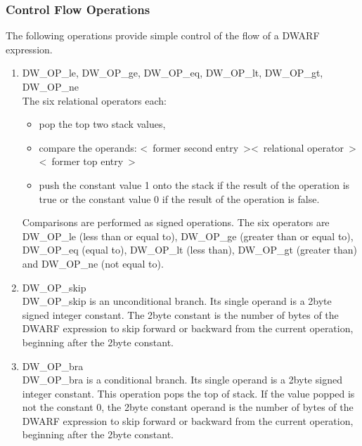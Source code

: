 \subsubsection{Control Flow Operations}
\label{chap:controlflowoperations}
The following operations provide simple control of the flow of a DWARF expression.
\begin{enumerate}[1]
\item  DW\-\_OP\-\_le, DW\-\_OP\-\_ge, DW\-\_OP\-\_eq, DW\-\_OP\-\_lt, DW\-\_OP\-\_gt, DW\-\_OP\-\_ne \\
The six relational operators each:
\begin{itemize}
\item pop the top two stack values,

\item compare the operands:
\textless~former second entry~\textgreater  \textless~relational operator~\textgreater \textless~former top entry~\textgreater

\item push the constant value 1 onto the stack 
if the result of the operation is true or the
constant value 0 if the result of the operation is false.
\end{itemize}

Comparisons are performed as signed operations. The six
operators are DW\-\_OP\-\_le (less than or equal to), DW\-\_OP\-\_ge
(greater than or equal to), DW\-\_OP\-\_eq (equal to), DW\-\_OP\-\_lt (less
than), DW\-\_OP\-\_gt (greater than) and DW\-\_OP\-\_ne (not equal to).

\item DW\-\_OP\-\_skip \\
DW\-\_OP\-\_skip is an unconditional branch. Its single operand
is a 2\dash byte signed integer constant. The 2\dash byte constant is
the number of bytes of the DWARF expression to skip forward
or backward from the current operation, beginning after the
2\dash byte constant.

\item DW\-\_OP\-\_bra \\
DW\-\_OP\-\_bra is a conditional branch. Its single operand is a
2\dash byte signed integer constant.  This operation pops the
top of stack. If the value popped is not the constant 0,
the 2\dash byte constant operand is the number of bytes of the
DWARF expression to skip forward or backward from the current
operation, beginning after the 2\dash byte constant.


\end{enumerate}
